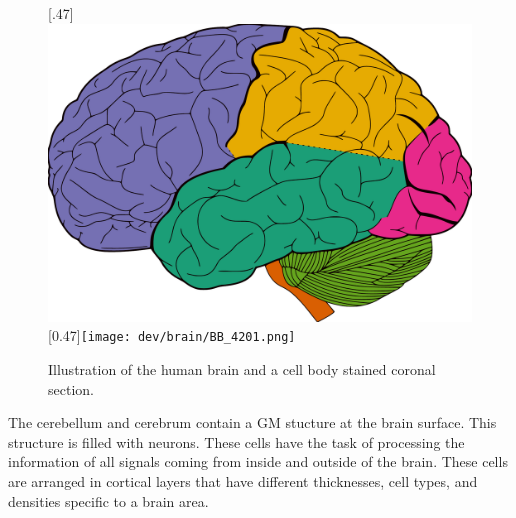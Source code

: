 \begin{figure}[!t]
\centering
{}[.47\textwidth]{\includegraphics[height=0.3\textwidth]{gfx/neuroanatomy/brain_lobes.pdf}}
\hfill
\tikzset{external/export next=false}
%
    [0.47\textwidth]{\texttt{[image: dev/brain/BB\_4201.png]}}
\caption{Illustration of the human brain and a cell body stained coronal section.}
\label{fig:humanBrain}
\end{figure}
%
The cerebellum and cerebrum contain a \ac{GM} stucture at the brain surface.
This structure is filled with neurons.
These cells have the task of processing the information of all signals coming from inside and outside of the brain.
These cells are arranged in cortical layers that have different thicknesses, cell types, and densities specific to a brain area.
